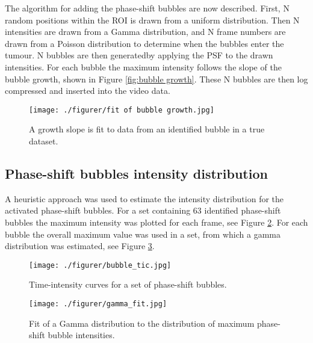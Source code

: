 The algorithm for adding the phase-shift bubbles are now described. First, N random positions within the ROI is drawn from a uniform distribution. Then N intensities are drawn from a Gamma distribution, and N frame numbers are drawn from a Poisson distribution to determine when the bubbles enter the tumour. N bubbles are then generatedby applying the PSF to the drawn intensities. For each bubble the maximum intensity follows the slope of the bubble growth, shown in Figure \ref{fig:bubble growth}. These N bubbles are then log compressed and inserted into the video data. 


\begin{figure}[h]
  \centering
  \label{Fig:Sonazoid2}
  \texttt{[image: ./figurer/fit of bubble growth.jpg]}
  \caption{A growth slope is fit to data from an identified bubble in a true dataset.}
\end{figure}


\subsection{Phase-shift bubbles intensity distribution}
A heuristic approach was used to estimate the intensity distribution for the activated phase-shift bubbles. For a set containing 63 identified phase-shift bubbles the maximum intensity was plotted for each frame, see Figure \ref{Fig:bubble_tic}. For each bubble the overall maximum value was used in a set, from which a gamma distribution was estimated, see Figure \ref{Fig:gamma_fit}.

\begin{figure}[h]
  \centering
  \label{Fig:bubble_tic}
  \texttt{[image: ./figurer/bubble\_tic.jpg]}
  \caption{Time-intensity curves for a set of phase-shift bubbles.}
\end{figure}
\begin{figure}[h]
  \centering
  \label{Fig:gamma_fit}
  \texttt{[image: ./figurer/gamma\_fit.jpg]}
  \caption{Fit of a Gamma distribution to the distribution of maximum phase-shift bubble intensities.}
\end{figure}

